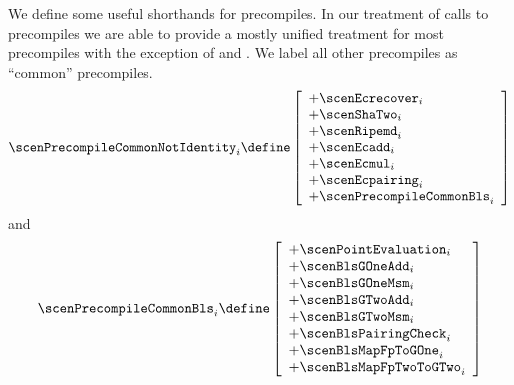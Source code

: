 We define some useful shorthands for precompiles.
In our treatment of calls to precompiles we are able to provide a mostly unified treatment for most precompiles with the exception of  and .
We label all other precompiles as ``common'' precompiles.
\[
	\scenPrecompileCommonNotIdentity _{i}
	\define
	\left[ \begin{array}{l}
		+ \scenEcrecover       _{i} \\
		+ \scenShaTwo          _{i} \\
		+ \scenRipemd          _{i} \\
		+ \scenEcadd           _{i} \\
		+ \scenEcmul           _{i} \\
		+ \scenEcpairing       _{i} \\
		+ \scenPrecompileCommonBls _{i} \\
	\end{array} \right]
\]
and
\[
	\scenPrecompileCommonBls _{i}
	\define
	\left[ \begin{array}{l}
		+ \scenPointEvaluation    _{i} \\
		+ \scenBlsGOneAdd         _{i} \\
		+ \scenBlsGOneMsm         _{i} \\
		+ \scenBlsGTwoAdd         _{i} \\
		+ \scenBlsGTwoMsm         _{i} \\
		+ \scenBlsPairingCheck    _{i} \\
		+ \scenBlsMapFpToGOne     _{i} \\
		+ \scenBlsMapFpTwoToGTwo  _{i} \\
	\end{array} \right]
\]
